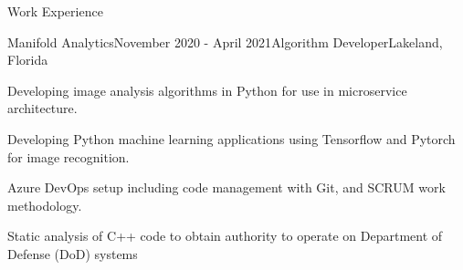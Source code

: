 \documentclass{resume} %
\begin{document}
\begin{rSection}{Work Experience}
	\begin{rSubsection}{Manifold Analytics}{November 2020 - April 2021}{Algorithm Developer}{Lakeland, Florida}
		\item Developing image analysis algorithms in Python for use in microservice architecture.
		\item Developing Python machine learning applications using Tensorflow and Pytorch for image recognition.
		\item Azure DevOps setup including code management with Git, and SCRUM work methodology.
		\item Static analysis of C++ code to obtain authority to operate on Department of Defense (DoD) systems
	\end{rSubsection}
	
	
	
	\end{rSection}
\newpage	
\end{document}
